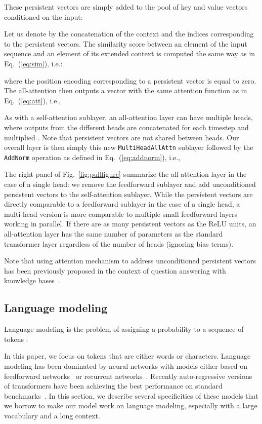 \documentclass{article}
\begin{document}
These persistent vectors are simply added to the pool of key and value vectors conditioned on the input:

Let us denote by  the concatenation of the context  and the indices corresponding to the  persistent vectors.
The similarity score between an element  of the input sequence and an element  of its extended context  is computed the same way as in Eq.~(\ref{eq:sim}), i.e.:

where the position encoding corresponding to a persistent vector is equal to zero.
The all-attention then outputs a vector  with the same attention function as in Eq.~(\ref{eq:att}), i.e.,


As with a self-attention sublayer, an all-attention layer can have multiple heads,
where outputs from the different heads are concatenated for each timestep  and multiplied .
Note that persistent vectors are not shared between heads.
Our overall layer is then simply this new \texttt{MultiHeadAllAttn} sublayer followed by the \texttt{AddNorm} operation as defined in Eq.~(\ref{eq:addnorm}), i.e.,

The right panel of Fig.~\ref{fig:pullfigure} summarize the all-attention layer in the case of a single head: we remove the feedforward sublayer and add unconditioned persistent vectors to the self-attention sublayer.
While the persistent vectors are directly comparable to a feedforward sublayer in the case of a single head, a multi-head version is more comparable to multiple small feedforward layers working in parallel.
If there are as many persistent vectors as the ReLU units, an all-attention layer has the same number of parameters as the standard transformer layer regardless of the number of heads (ignoring bias terms).

Note that using attention mechanism to address unconditioned persistent vectors has been previously proposed in the context of question answering with knowledge bases~\cite{miller2016key}.




\subsection{Language modeling}

Language modeling is the problem of assigning a probability to a sequence of tokens :

In this paper, we focus on tokens that are either words or characters.
Language modeling has been dominated by neural networks with models either based on feedforward networks~\cite{bengio2003neural} or recurrent networks~\cite{mikolov2010recurrent}.
Recently auto-regressive versions of transformers have been achieving the best performance on standard benchmarks~\cite{al2018character,dai2019transformer,baevski2018adaptive}.
In this section, we describe several specificities of these models that we borrow to make our model work on language modeling, especially with a large vocabulary and a long context.
\end{document}
